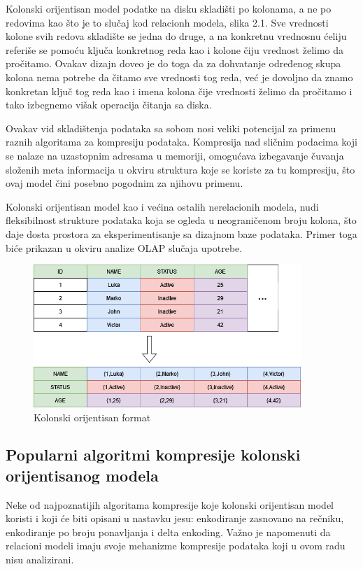 \documentclass[12pt,oneside]{memoir}
\begin{document}
Kolonski orijentisan model podatke na disku skladišti po kolonama, a ne po redovima kao što je to slučaj kod relacionh modela, slika 2.1. Sve vrednosti kolone svih redova skladište se jedna do druge, a na konkretnu vrednosnu ćeliju referiše se pomoću ključa konkretnog reda kao i kolone čiju vrednost želimo da pročitamo. Ovakav dizajn doveo je do toga da za dohvatanje određenog skupa kolona nema potrebe da čitamo sve vrednosti tog reda, već je dovoljno da znamo konkretan ključ tog reda kao i imena kolona čije vrednosti želimo da pročitamo i tako izbegnemo višak operacija čitanja sa diska.

Ovakav vid skladištenja podataka sa sobom nosi veliki potencijal za primenu raznih algoritama za kompresiju podataka.  Kompresija nad sličnim podacima koji se nalaze na uzastopnim adresama u memoriji, omogućava izbegavanje čuvanja složenih meta informacija u okviru struktura koje se koriste za tu kompresiju, što ovaj model čini posebno pogodnim za njihovu primenu.

Kolonski orijentisan model kao i većina ostalih nerelacionih modela, nudi fleksibilnost strukture podataka koja se ogleda u neograničenom broju kolona, što daje dosta prostora za eksperimentisanje sa dizajnom baze podataka. Primer toga biće prikazan u okviru analize OLAP slučaja upotrebe. 
\begin{figure}[!ht]
  \vspace*{4cm}
  \centering
  \includegraphics[width=0.9\textwidth]{relational-column-oriented.png}
  \caption{Kolonski orijentisan format}
  \label{fig:grafikon}
\end{figure}

\subsection{Popularni algoritmi kompresije kolonski orijentisanog modela}

Neke od najpoznatijih algoritama kompresije koje kolonski orijentisan model koristi i koji će biti opisani u nastavku jesu: enkodiranje zasnovano na rečniku, enkodiranje po broju ponavljanja i delta enkoding. Važno je napomenuti da relacioni modeli imaju svoje mehanizme kompresije podataka koji u ovom radu nisu analizirani.
\end{document}
